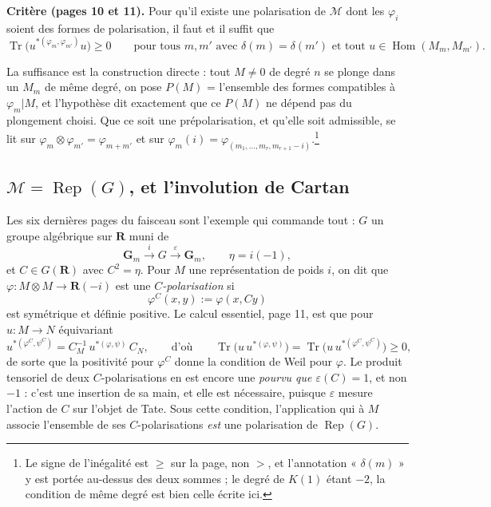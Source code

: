 \documentclass[11pt,a4paper]{article}
\begin{document}
\textbf{Critère (pages 10 et 11).} Pour qu'il existe une polarisation de
$\mathcal{M}$ dont les $\varphi_{i}$ soient des formes de polarisation, il faut
et il suffit que
\[
\operatorname{Tr}\bigl( u^{*(\varphi_{m}, \varphi_{m'})} u \bigr) \geqslant 0
\qquad\text{pour tous } m, m' \text{ avec } \delta(m) = \delta(m')
\text{ et tout } u \in \operatorname{Hom}(M_{m}, M_{m'}) .
\]

La suffisance est la construction directe : tout $M \neq 0$ de degré $n$ se
plonge dans un $M_{m}$ de même degré, on pose $P(M)$ = l'ensemble des formes
compatibles à $\varphi_{m}|M$, et l'hypothèse dit exactement que ce $P(M)$ ne
dépend pas du plongement choisi. Que ce soit une prépolarisation, et qu'elle
soit admissible, se lit sur $\varphi_{m} \otimes \varphi_{m'} =
\varphi_{m+m'}$ et sur $\varphi_{m}(i) = \varphi_{(m_{1}, \ldots, m_{r},
m_{r+1}-i)}$.\footnote{Le signe de l'inégalité est $\geqslant$ sur la page,
non $>$, et l'annotation « $\delta(m)$ » y est portée au-dessus des deux
sommes ; le degré de $K(1)$ étant $-2$, la condition de même degré est bien
celle écrite ici.}

\subsection*{$\mathcal{M} = \operatorname{Rep}(G)$, et l'involution de Cartan}

Les six dernières pages du faisceau sont l'exemple qui commande tout : $G$ un
groupe algébrique sur $\mathbf{R}$ muni de
\[
\mathbf{G}_{m} \xrightarrow{\ i\ } G \xrightarrow{\ \varepsilon\ } \mathbf{G}_{m} ,
\qquad \eta = i(-1) ,
\]
et $C \in G(\mathbf{R})$ avec $C^{2} = \eta$. Pour $M$ une représentation de
poids $i$, on dit que $\varphi \colon M \otimes M \to \mathbf{R}(-i)$ est une
\emph{$C$-polarisation} si
\[
\varphi^{C}(x,y) := \varphi(x, Cy)
\]
est symétrique et définie positive. Le calcul essentiel, page 11, est que pour
$u \colon M \to N$ équivariant
\[
u^{*(\varphi^{C}, \psi^{C})} = C_{M}^{-1}\, u^{*(\varphi,\psi)}\, C_{N} ,
\qquad\text{d'où}\qquad
\operatorname{Tr}\bigl( u\, u^{*(\varphi,\psi)} \bigr)
= \operatorname{Tr}\bigl( u\, u^{*(\varphi^{C},\psi^{C})} \bigr) \geqslant 0 ,
\]
de sorte que la positivité pour $\varphi^{C}$ donne la condition de Weil pour
$\varphi$. Le produit tensoriel de deux $C$-polarisations en est encore une
\emph{pourvu que $\varepsilon(C) = 1$}, et non $-1$ : c'est une insertion de sa
main, et elle est nécessaire, puisque $\varepsilon$ mesure l'action de $C$ sur
l'objet de Tate. Sous cette condition, l'application qui à $M$ associe
l'ensemble de ses $C$-polarisations \emph{est} une polarisation de
$\operatorname{Rep}(G)$.
\end{document}
